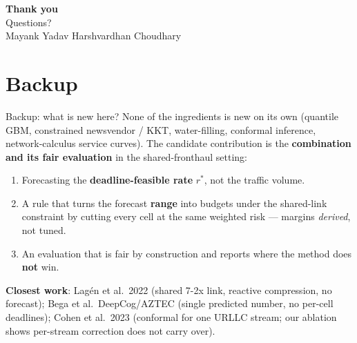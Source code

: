 \documentclass[aspectratio=169,11pt,xcolor=table]{beamer}
\newcommand{\rstar}{r^{\ast}}
\begin{document}
\begin{frame}[noframenumbering]
  \centering
  \vspace{2em}
  {\Huge\textcolor{iitblue}{\textbf{Thank you}}}\\[1.5em]
  {\Large Questions?}\\[2em]
  \small Mayank Yadav \quad\textbullet\quad Harshvardhan Choudhary
\end{frame}

\appendix
\section*{Backup}

\begin{frame}[noframenumbering]{Backup: what is new here?}
  None of the ingredients is new on its own (quantile GBM, constrained newsvendor / KKT, water-filling, conformal inference, network-calculus service curves). The candidate contribution is the \textbf{combination and its fair evaluation} in the shared-fronthaul setting:
  \begin{enumerate}
    \item Forecasting the \textbf{deadline-feasible rate} $\rstar$, not the traffic volume.
    \item A rule that turns the forecast \textbf{range} into budgets under the shared-link constraint by cutting every cell at the same weighted risk --- margins \emph{derived}, not tuned.
    \item An evaluation that is fair by construction and reports where the method does \textbf{not} win.
  \end{enumerate}
  \vspace{0.5em}
  \textbf{Closest work}: Lag\'en et al.\ 2022 (shared 7-2x link, reactive compression, no forecast); Bega et al.\ DeepCog/AZTEC (single predicted number, no per-cell deadlines); Cohen et al.\ 2023 (conformal for one URLLC stream; our ablation shows per-stream correction does not carry over).
\end{frame}
\end{document}
